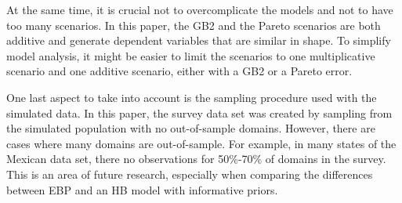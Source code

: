 At the same time, it is crucial not to overcomplicate the models and not to have too many scenarios.
In this paper, the GB2 and the Pareto scenarios are both additive and generate dependent variables that are similar in shape.
To simplify model analysis, it might be easier to limit the scenarios to one multiplicative scenario and one additive scenario, either with a GB2 or a Pareto error.

One last aspect to take into account is the sampling procedure used with the simulated data.
In this paper, the survey data set was created by sampling from the simulated population with no out-of-sample domains.
However, there are cases where many domains are out-of-sample.
For example, in many states of the Mexican data set, there no observations for 50\%-70\% of domains in the survey.
This is an area of future research, especially when comparing the differences between EBP and an HB model with informative priors.


